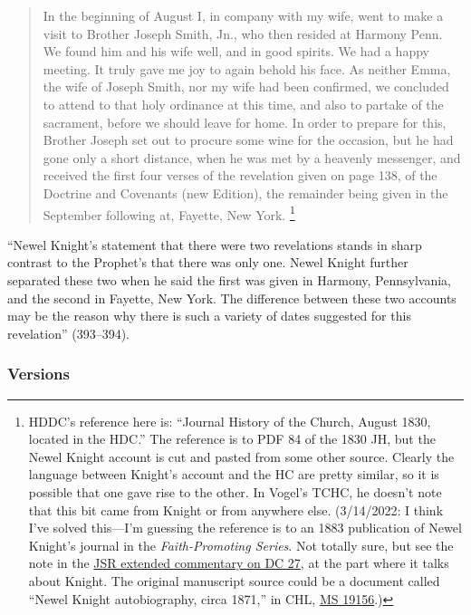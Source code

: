				\begin{quote}
					In the beginning of August I, in company with my wife, went to make a visit to Brother Joseph Smith, Jn., who then resided at Harmony Penn. We found him and his wife well, and in good spirits. We had a happy meeting. It truly gave me joy to again behold his face. As neither Emma, the wife of Joseph Smith, nor my wife had been confirmed, we concluded to attend to that holy ordinance at this time, and also to partake of the sacrament, before we should leave for home. In order to prepare for this, Brother Joseph set out to procure some wine for the occasion, but he had gone only a short distance, when he was met by a heavenly messenger, and received the first four verses of the revelation given on page 138, of the Doctrine and Covenants (new Edition), the remainder being given in the September following at, Fayette, New York.%
						\footnote{%
							HDDC's reference here is: ``Journal History of the Church, August 1830, located in the HDC.'' The reference is to PDF 84 of the 1830 JH, but the Newel Knight account is cut and pasted from some other source. Clearly the language between Knight's account and the HC are pretty similar, so it is possible that one gave rise to the other. In Vogel's TCHC, he doesn't note that this bit came from Knight or from anywhere else. (3/14/2022: I think I've solved this---I'm guessing the reference is to an 1883 publication of Newel Knight's journal in the \textit{Faith-Promoting Series}. Not totally sure, but see the note in the \hyperref[EXSS-DC27-JSR]{JSR extended commentary on DC 27}, at the part where it talks about Knight. The original manuscript source could be a document called ``Newel Knight autobiography, circa 1871,'' in CHL, \href{https://catalog.churchofjesuschrist.org/record/b99838e6-d9d0-41b5-82f0-66901ac38a8b/0?view=browse}{MS 19156}.)
							}
				\end{quote}
				
			\noindent ``Newel Knight's statement that there were two revelations stands in sharp contrast to the Prophet's that there was only one. Newel Knight further separated these two when he said the first was given in Harmony, Pennsylvania, and the second in Fayette, New York. The difference between these two accounts may be the reason why there is such a variety of dates suggested for this revelation'' (393--394).
			
	\subsubsection{Versions}
		\label{DC27-V}
		
